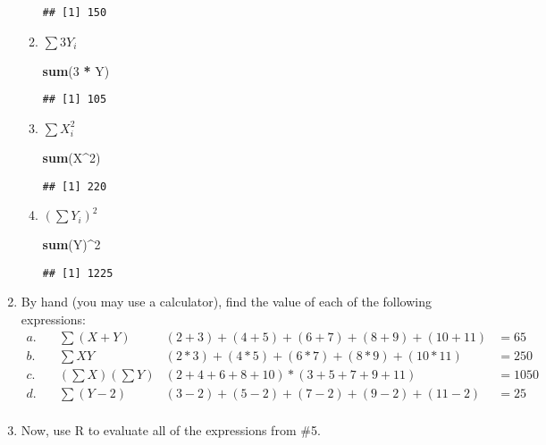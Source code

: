 \documentclass[]{article}
\newenvironment{Shaded}{\begin{snugshade}}{\end{snugshade}}
\newcommand{\KeywordTok}[1]{\textcolor[rgb]{0.13,0.29,0.53}{\textbf{#1}}}
\newcommand{\DecValTok}[1]{\textcolor[rgb]{0.00,0.00,0.81}{#1}}
\newcommand{\StringTok}[1]{\textcolor[rgb]{0.31,0.60,0.02}{#1}}
\newcommand{\OperatorTok}[1]{\textcolor[rgb]{0.81,0.36,0.00}{\textbf{#1}}}
\newcommand{\NormalTok}[1]{#1}
\begin{document}
\begin{enumerate}
\begin{enumerate}
\begin{verbatim}
## [1] 150
\end{verbatim}
  \item
    \(\displaystyle\sum 3Y_i\)

\begin{Shaded}
\begin{Highlighting}[]
\KeywordTok{sum}\NormalTok{(}\DecValTok{3} \OperatorTok{*}\StringTok{ }\NormalTok{Y)}
\end{Highlighting}
\end{Shaded}

\begin{verbatim}
## [1] 105
\end{verbatim}
  \item
    \(\displaystyle\sum X_i^2\)

\begin{Shaded}
\begin{Highlighting}[]
\KeywordTok{sum}\NormalTok{(X}\OperatorTok{^}\DecValTok{2}\NormalTok{)}
\end{Highlighting}
\end{Shaded}

\begin{verbatim}
## [1] 220
\end{verbatim}
  \item
    \((\displaystyle\sum Y_i)^2\)

\begin{Shaded}
\begin{Highlighting}[]
\KeywordTok{sum}\NormalTok{(Y)}\OperatorTok{^}\DecValTok{2}
\end{Highlighting}
\end{Shaded}

\begin{verbatim}
## [1] 1225
\end{verbatim}
  \end{enumerate}
\item
  By hand (you may use a calculator), find the value of each of the
  following expressions: \begin{align*}
    a.\quad & \displaystyle\sum(X + Y) & (2 + 3) + (4 + 5) + (6 + 7) + (8 + 9) + (10 + 11) &= 65\\
    b.\quad & \displaystyle\sum XY & (2 * 3) + (4 * 5) + (6 * 7) + (8 * 9) + (10 * 11) &= 250\\
    c.\quad & (\displaystyle\sum X)(\displaystyle\sum Y) & (2 + 4 + 6 + 8 + 10) * (3 + 5 + 7 + 9 + 11) &= 1050\\
    d.\quad & \displaystyle\sum(Y - 2) & (3 - 2) + (5 - 2) + (7 - 2) + (9 - 2) + (11 - 2) &= 25\\
    \end{align*}
\item
  Now, use R to evaluate all of the expressions from \#5.


\end{enumerate}
\end{document}
